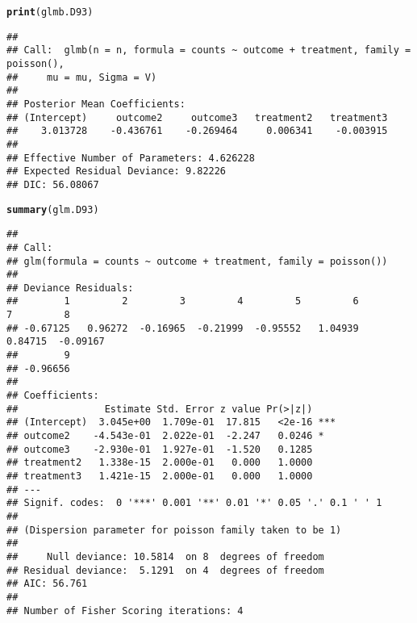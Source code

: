\documentclass{article}\usepackage[]{graphicx}\usepackage[]{color}
\makeatletter
\newcommand{\hlstd}[1]{\textcolor[rgb]{0.345,0.345,0.345}{#1}}%
\newcommand{\hlkwd}[1]{\textcolor[rgb]{0.737,0.353,0.396}{\textbf{#1}}}%
\newenvironment{kframe}{%
 \def\at@end@of@kframe{}%
 \ifinner\ifhmode%
  \def\at@end@of@kframe{\end{minipage}}%
  \begin{minipage}{\columnwidth}%
 \fi\fi%
 \def\FrameCommand##1{\hskip\@totalleftmargin \hskip-\fboxsep
 \colorbox{shadecolor}{##1}\hskip-\fboxsep
     \hskip-\linewidth \hskip-\@totalleftmargin \hskip\columnwidth}%
 \MakeFramed {\advance\hsize-\width
   \@totalleftmargin\z@ \linewidth\hsize
   \@setminipage}}%
 {\par\unskip\endMakeFramed%
 \at@end@of@kframe}
\newenvironment{knitrout}{}{} %
\makeatother
\begin{document}
\begin{knitrout}
\color{fgcolor}\begin{kframe}
\begin{alltt}
\hlkwd{print}\hlstd{(glmb.D93)}
\end{alltt}
\begin{verbatim}
## 
## Call:  glmb(n = n, formula = counts ~ outcome + treatment, family = poisson(), 
##     mu = mu, Sigma = V)
## 
## Posterior Mean Coefficients:
## (Intercept)     outcome2     outcome3   treatment2   treatment3  
##    3.013728    -0.436761    -0.269464     0.006341    -0.003915  
## 
## Effective Number of Parameters: 4.626228 
## Expected Residual Deviance: 9.82226 
## DIC: 56.08067
\end{verbatim}
\end{kframe}
\end{knitrout}

\begin{knitrout}
\color{fgcolor}\begin{kframe}
\begin{alltt}
\hlkwd{summary}\hlstd{(glm.D93)}
\end{alltt}
\begin{verbatim}
## 
## Call:
## glm(formula = counts ~ outcome + treatment, family = poisson())
## 
## Deviance Residuals: 
##        1         2         3         4         5         6         7         8  
## -0.67125   0.96272  -0.16965  -0.21999  -0.95552   1.04939   0.84715  -0.09167  
##        9  
## -0.96656  
## 
## Coefficients:
##               Estimate Std. Error z value Pr(>|z|)    
## (Intercept)  3.045e+00  1.709e-01  17.815   <2e-16 ***
## outcome2    -4.543e-01  2.022e-01  -2.247   0.0246 *  
## outcome3    -2.930e-01  1.927e-01  -1.520   0.1285    
## treatment2   1.338e-15  2.000e-01   0.000   1.0000    
## treatment3   1.421e-15  2.000e-01   0.000   1.0000    
## ---
## Signif. codes:  0 '***' 0.001 '**' 0.01 '*' 0.05 '.' 0.1 ' ' 1
## 
## (Dispersion parameter for poisson family taken to be 1)
## 
##     Null deviance: 10.5814  on 8  degrees of freedom
## Residual deviance:  5.1291  on 4  degrees of freedom
## AIC: 56.761
## 
## Number of Fisher Scoring iterations: 4
\end{verbatim}
\end{kframe}
\end{knitrout}
\end{document}
